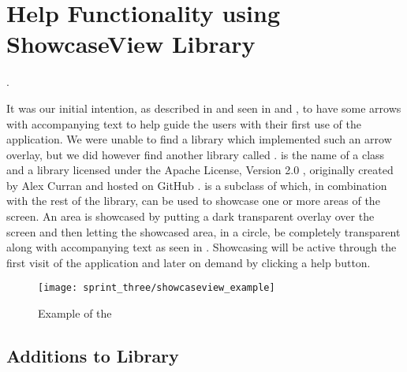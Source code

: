 
\section{Help Functionality using ShowcaseView Library}
\label{sec:help_functionality_using_showcaseview_library}

.

It was our initial intention, as described in  and seen in  and , to have some arrows with accompanying text to help guide the users with their first use of the application. We were unable to find a library which implemented such an arrow overlay, but we did however find another library called .  is the name of a class and a library licensed under the Apache License, Version 2.0 \parencite{apache2license}, originally created by Alex Curran and hosted on GitHub \parencite{showcaseview_by_alex_curran}.  is a subclass of  which, in combination with the rest of the library, can be used to showcase one or more areas of the screen. An area is showcased by putting a dark transparent overlay over the screen and then letting the showcased area, in a circle, be completely transparent along with accompanying text as seen in . Showcasing will be active through the first visit of the application and later on demand by clicking a help button. 

\begin{figure}[!htbp]
    \centering
    \texttt{[image: sprint\_three/showcaseview\_example]}
    \caption{Example of the }
    \label{fig:showcaseview_example}
\end{figure}

\subsection{Additions to Library}

